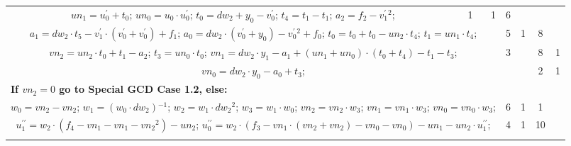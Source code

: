 \begin{tabular}{|c|cr|c|c|c|c|}
{$un_1=u^{\prime}_0+t_0$;\hspace{4pt}
$un_0=u_0 \cdot u^{\prime}_0$;\hspace{4pt}
$t_0=dw_2+y_0-v^{\prime}_0$;\hspace{4pt}
$t_4=t_1-t_1$;\hspace{4pt}
$a_2=f_2-v^{\prime}_1{}^{2}$;\hspace{4pt}
} & 1 & 1 & 6 & \\
\multicolumn{3}{|R{340pt}|}{ 
$a_1=dw_2 \cdot t_5-v^{\prime}_1 \cdot (v^{\prime}_0+v^{\prime}_0)+f_1$;\hspace{4pt}
$a_0=dw_2 \cdot (v^{\prime}_0+y_0)-v^{\prime}_0{}^{2}+f_0$;\hspace{4pt}
$t_0=t_0+t_0-un_2 \cdot t_4$;\hspace{4pt}
$t_1=un_1 \cdot t_4$;\hspace{4pt}
} & 5 & 1 & 8 & \\
\multicolumn{3}{|R{340pt}|}{ 
$vn_2=un_2 \cdot t_0+t_1-a_2$;\hspace{4pt}
$t_3=un_0 \cdot t_0$;\hspace{4pt}
$vn_1=dw_2 \cdot y_1-a_1+(un_1+un_0) \cdot (t_0+t_4)-t_1-t_3$;\hspace{4pt}
} & 3 &  & 8 & 1\\
\multicolumn{3}{|R{340pt}|}{ 
$vn_0=dw_2 \cdot y_0-a_0+t_3$;\hspace{4pt}
} &  &  & 2 & 1\\
\multicolumn{3}{|l|}{ 
 \bf{If $vn_2 = 0$ go to Special GCD Case 1.2, else:} } &  &  &  & \\
\multicolumn{3}{|R{340pt}|}{ 
$w_0=vn_2-vn_2$;\hspace{4pt}
$w_1=(w_0 \cdot dw_2){}^{-1}$;\hspace{4pt}
$w_2=w_1 \cdot dw_2{}^{2}$;\hspace{4pt}
$w_3=w_1 \cdot w_0$;\hspace{4pt}
$vn_2=vn_2 \cdot w_3$;\hspace{4pt}
$vn_1=vn_1 \cdot w_3$;\hspace{4pt}
$vn_0=vn_0 \cdot w_3$;\hspace{4pt}
} & 6 & 1 & 1 & \\
\multicolumn{3}{|R{340pt}|}{ 
$u^{\prime\prime}_1=w_2 \cdot (f_4-vn_1-vn_1-vn_2{}^{2})-un_2$;\hspace{4pt}
$u^{\prime\prime}_0=w_2 \cdot (f_3-vn_1 \cdot (vn_2+vn_2)-vn_0-vn_0)-un_1-un_2 \cdot u^{\prime\prime}_1$;\hspace{4pt}
} & 4 & 1 & 10 & \\
\multicolumn{3}{|R{340pt}|}{ 
}
\end{tabular}
